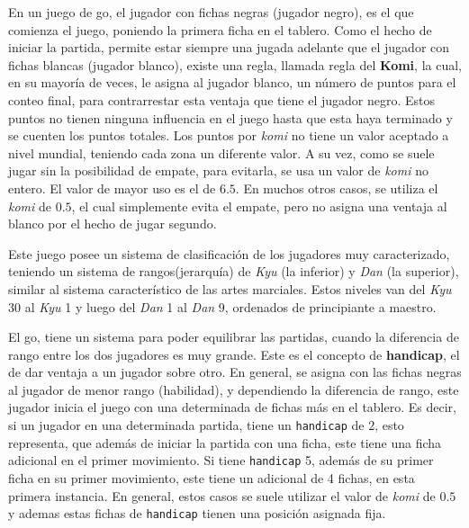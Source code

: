 \documentclass[11pt,twoside,spanish]{report} %
\begin{document}
En un juego de go, el jugador con fichas negras (jugador negro), es el que comienza el juego, poniendo la primera ficha en el tablero.
Como el hecho de iniciar la partida, permite estar siempre una jugada adelante que el jugador con fichas blancas (jugador blanco), existe una regla, llamada regla del \textbf{Komi}, la cual, en su mayor\'ia de veces, le asigna al jugador blanco, un n\'umero de puntos para el conteo final, para contrarrestar esta ventaja que tiene el jugador negro.
Estos puntos no tienen ninguna influencia en el juego hasta que esta haya terminado y se cuenten los puntos totales.
Los puntos por \emph{komi} no tiene un valor aceptado a nivel mundial, teniendo cada zona un diferente valor.
A su vez, como se suele jugar sin la posibilidad de empate, para evitarla, se usa un valor de \emph{komi} no entero.
El valor de mayor uso es el de $6.5$.
En muchos otros casos, se utiliza el \emph{komi} de $0.5$, el cual simplemente evita el empate, pero no asigna una ventaja al blanco por el hecho de jugar segundo.


Este juego posee un sistema de clasificaci\'on de los jugadores muy caracterizado, teniendo un sistema de rangos(jerarqu\'ia) de \textit{Kyu} (la inferior) y \textit{Dan} (la superior), similar al sistema caracter\'istico de las artes marciales. Estos niveles van del \textit{Kyu} 30 al \textit{Kyu} 1 y luego del \textit{Dan} 1 al \textit{Dan} 9, ordenados de principiante a maestro.

El go, tiene un sistema para poder equilibrar las partidas, cuando la diferencia de rango entre los dos jugadores es muy grande.
Este es el concepto de \textbf{handicap}, el de dar ventaja a un jugador sobre otro.
En general, se asigna con las fichas negras al jugador de menor rango (habilidad), y dependiendo la diferencia de rango, este jugador inicia el juego con una determinada de fichas m\'as en el tablero.
Es decir, si un jugador en una determinada partida, tiene un \texttt{handicap} de 2, esto representa, que adem\'as de iniciar la partida con una ficha, este tiene una ficha adicional en el primer movimiento.
Si tiene \texttt{handicap} 5, adem\'as  de su primer ficha en su primer movimiento, este tiene un adicional de 4 fichas, en esta primera instancia.
En general, estos casos se suele utilizar el valor de \emph{komi} de $0.5$ y ademas estas fichas de \texttt{handicap} tienen una posici\'on asignada fija.
\end{document}
